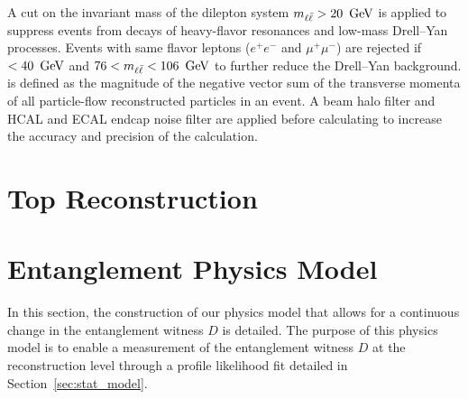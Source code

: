 A cut on the invariant mass of the dilepton system $m_{\ell \bar{\ell}} > 20~\,\text{Ge\hspace{-.08em}V}$ is applied to suppress events from decays of heavy-flavor resonances and low-mass Drell--Yan processes. Events with same flavor leptons ($e^+e^-$ and $\mu^+\mu^-$) are rejected if \met$<40~\,\text{Ge\hspace{-.08em}V}$ and $76 < m_{\ell \bar{\ell}} < 106~\,\text{Ge\hspace{-.08em}V}$ to further reduce the Drell--Yan background. \met is defined as the magnitude of the negative vector sum of the transverse momenta of all particle-flow reconstructed particles in an event. A beam halo filter and HCAL and ECAL endcap noise filter are applied before calculating \met to increase the accuracy and precision of the calculation.

\section{Top Reconstruction}

\section{Entanglement Physics Model}
\label{sec:physmodel}
In this section, the construction of our physics model that allows for a continuous change in the entanglement witness $D$ is detailed. The purpose of this physics model is to enable a measurement of the entanglement witness $D$ at the reconstruction level through a profile likelihood fit detailed in Section~\ref{sec:stat_model}.

